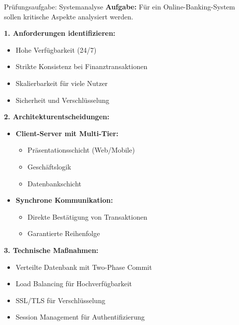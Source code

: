 \begin{example2}{Prüfungsaufgabe: Systemanalyse}
\textbf{Aufgabe:}
Für ein Online-Banking-System sollen kritische Aspekte analysiert werden.

\textbf{1. Anforderungen identifizieren:}
\begin{itemize}
    \item Hohe Verfügbarkeit (24/7)
    \item Strikte Konsistenz bei Finanztransaktionen
    \item Skalierbarkeit für viele Nutzer
    \item Sicherheit und Verschlüsselung
\end{itemize}

\textbf{2. Architekturentscheidungen:}
\begin{itemize}
    \item \textbf{Client-Server mit Multi-Tier:}
    \begin{itemize}
        \item Präsentationsschicht (Web/Mobile)
        \item Geschäftslogik
        \item Datenbankschicht
    \end{itemize}
    
    \item \textbf{Synchrone Kommunikation:}
    \begin{itemize}
        \item Direkte Bestätigung von Transaktionen
        \item Garantierte Reihenfolge
    \end{itemize}
\end{itemize}

\textbf{3. Technische Maßnahmen:}
\begin{itemize}
    \item Verteilte Datenbank mit Two-Phase Commit
    \item Load Balancing für Hochverfügbarkeit
    \item SSL/TLS für Verschlüsselung
    \item Session Management für Authentifizierung
\end{itemize}
\end{example2}


